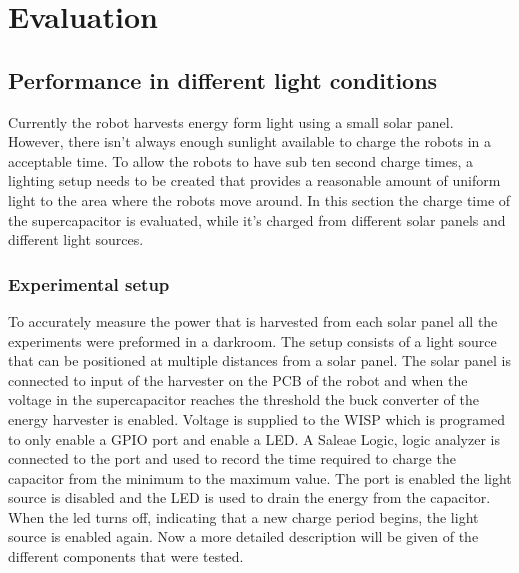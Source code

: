\chapter{Evaluation} 



\section{Performance in different light conditions}

Currently the robot harvests energy form light using a small solar panel.
However, there isn't always enough sunlight available to charge the robots in a acceptable time.
To allow the robots to have sub ten second charge times, a lighting setup needs to be created that provides a reasonable amount of uniform light to the area where the robots move around.
In this section the charge time of the supercapacitor is evaluated, while it's charged from different solar panels and different light sources.

\subsection{Experimental setup}
To accurately measure the power that is harvested from each solar panel all the experiments were preformed in a darkroom.
The setup consists of a light source that can be positioned at multiple distances from a solar panel.
The solar panel is connected to input of the harvester on the PCB of the robot and when the voltage in the supercapacitor reaches the threshold the buck converter of the energy harvester is enabled.
Voltage is supplied to the WISP which is programed to only enable a GPIO port and enable a LED.
A Saleae Logic, logic analyzer is connected to the port and used to record the time required to charge the capacitor from the minimum to the maximum value.
The port is enabled the light source is disabled and the LED is used to drain the energy from the capacitor.
When the led turns off, indicating that a new charge period begins, the light source is enabled again.
Now a more detailed description will be given of the different components that were tested.

